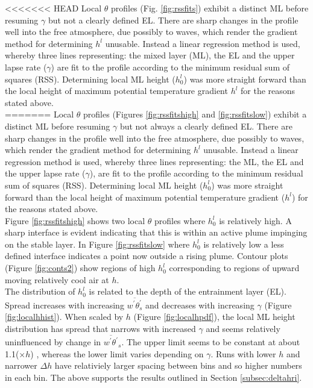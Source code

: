 <<<<<<< HEAD
Local $\theta$ profiles (Fig. \ref{fig:rssfits}) exhibit a distinct \acs{ML} before resuming $\gamma$ but not 
a clearly defined \acs{EL}. There are sharp changes in the profile well into the free atmosphere, due possibly to 
waves, which render the gradient method for determining $h^{l}$ unusable.  Instead a linear regression method is used, 
whereby three lines representing: the mixed layer (ML), the EL and the upper lapse rate ($\gamma$) are fit to the 
profile according to the minimum residual sum of squares (RSS).  Determining local \acs{ML} height ($h_{0}^{l}$) was 
more straight forward than the local height of maximum potential temperature gradient $h^{l}$ for the reasons stated 
above.\\  
=======
Local $\theta$ profiles (Figures \ref{fig:rssfitshigh} and \ref{fig:rssfitslow}) exhibit a distinct 
\acs{ML} before resuming $\gamma$ but 
not always a clearly defined \acs{EL}.  There are sharp changes in the profile well into the free 
atmosphere, due possibly to waves, which render the gradient method for determining $h^{l}$ 
unusable.  Instead a linear regression method is used, whereby three lines representing: the
 \acs{ML}, the \acs{EL} and the upper lapse rate ($\gamma$), are fit to the profile according 
to the minimum residual sum of squares (RSS).  Determining local \acs{ML} height ($h_{0}^{l}$) was 
more straight forward than the local height of maximum potential temperature gradient 
($h^{l}$) for the reasons stated above.\\  

Figure \ref{fig:rssfitshigh} shows two local $\theta$ profiles where $h_{0}^{l}$ is relatively high.  
A sharp interface is evident indicating that this is within an active plume impinging on the stable layer.
In Figure \ref{fig:rssfitslow} where $h_{0}^{l}$ is relatively low a less defined interface indicates 
a point now outside a rising plume.  Contour plots (Figure \ref{fig:conts2}) show regions of high 
$h_{0}^{l}$ corresponding to regions of upward moving relatively cool air at $h$.\\

The distribution of $h_{0}^{l}$ is related to the depth of the entrainment layer (\acs{EL}).
Spread increases with increasing $\overline{w^{'}\theta^{'}_{s}}$ and decreases with increasing $\gamma$
(Figure \ref{fig:localhhist}).  When scaled by $h$  (Figure \ref{fig:localhpdf}), the local \acs{ML} height distribution 
has spread that narrows with increased $\gamma$ and seems relatively uninfluenced by change in $\overline{w^{'}\theta^{'}}_{s}$.  
The upper limit seems to be constant at about 1.1($\times h$) , whereas the lower limit varies 
depending on $\gamma$.   Runs with lower $h$ and narrower $\Delta h$ have relativiely 
larger spacing between bins and so higher numbers in each bin.  The above supports the results outlined in
Section \ref{subsec:deltahri}.\\


